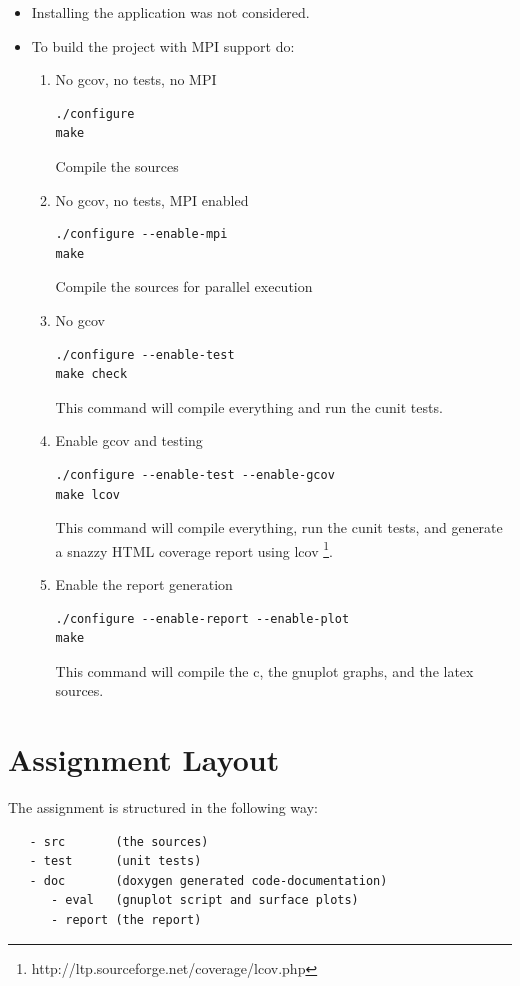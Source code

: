 \documentclass[12pt,a4paper]{report}
\begin{document}
\begin{itemize}
\item Installing the application was not considered.
\item To build the project with MPI support do:
  \begin{enumerate}
  \item No gcov, no tests, no MPI
\begin{verbatim}
./configure
make
\end{verbatim}
    Compile the sources
  \item No gcov, no tests, MPI enabled
\begin{verbatim}
./configure --enable-mpi
make
\end{verbatim}
    Compile the sources for parallel execution
  \item No gcov
\begin{verbatim}
./configure --enable-test
make check
\end{verbatim}
    This command will compile everything and run the cunit tests.
  \item Enable gcov and testing
\begin{verbatim}
./configure --enable-test --enable-gcov
make lcov
\end{verbatim}
    This command will compile everything, run the cunit tests, and
    generate a snazzy HTML coverage report using lcov
    \footnote{http://ltp.sourceforge.net/coverage/lcov.php}.
  \item Enable the report generation
\begin{verbatim}
./configure --enable-report --enable-plot
make
\end{verbatim}
    This command will compile the c, the gnuplot graphs, and the latex
    sources.
  \end{enumerate}
\end{itemize}

\section{Assignment Layout}
\label{sec:assignment-layout}

The assignment is structured in the following way:
\begin{verbatim}
   - src       (the sources)
   - test      (unit tests)
   - doc       (doxygen generated code-documentation)
      - eval   (gnuplot script and surface plots)
      - report (the report)
\end{verbatim}
\end{document}
